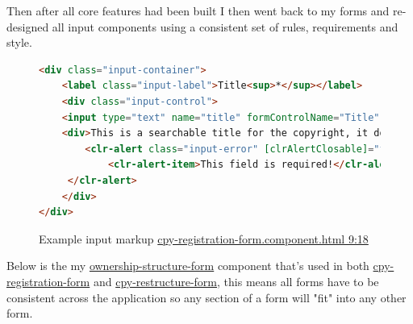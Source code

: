 \documentclass[12pt]{article}
\begin{document}
Then after all core features had been built I then went back to my forms and re-designed all input components using a consistent set of rules, requirements and style.    

\begin{figure}[H]
\caption{Example input markup \href{https://github.com/MrHarrisonBarker/CRPL/blob/main/CRPL.Web/ClientApp/src/app/Forms/cpy-registration-form/cpy-registration-form.component.html}{cpy-registration-form.component.html 9:18}}
\centering
\begin{lstlisting}[language=html]
<div class="input-container">
	<label class="input-label">Title<sup>*</sup></label>
	<div class="input-control">
	<input type="text" name="title" formControlName="Title" placeholder="Hello world"/>
	<div>This is a searchable title for the copyright, it doesn't have to be unique only descriptive and relevant&nbsp;<sup>*saved to the blockchain</sup></div>
		<clr-alert class="input-error" [clrAlertClosable]="false" clrAlertType="danger" *ngIf="InvalidAndUntouched('Title')">
		 	<clr-alert-item>This field is required!</clr-alert-item>
	 </clr-alert>
	</div>
</div>
\end{lstlisting}
\end{figure}

Below is the my \href{https://github.com/MrHarrisonBarker/CRPL/tree/main/CRPL.Web/ClientApp/src/app/Forms/ownership-structure-form}{ownership-structure-form} component that's used in both \href{https://github.com/MrHarrisonBarker/CRPL/tree/main/CRPL.Web/ClientApp/src/app/Forms/cpy-registration-form}{cpy-registration-form} and \href{https://github.com/MrHarrisonBarker/CRPL/tree/main/CRPL.Web/ClientApp/src/app/Forms/cpy-restructure-form}{cpy-restructure-form}, this means all forms have to be consistent across the application so any section of a form will "fit" into any other form.
\end{document}
